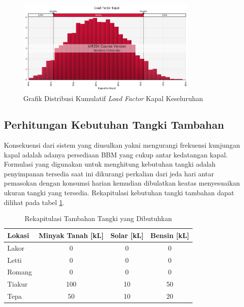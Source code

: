 \begin{figure}[htbp!]
    \centering
    \includegraphics[width=0.8\textwidth]{gambar/loadfactor-ship-overall.png}
    \caption{Grafik Distribusi Kumulatif \emph{Load Factor} Kapal Keseluruhan}
    \label{fig:load-factor-kapal-overall}
\end{figure}


\subsection{Perhitungan Kebutuhan Tangki Tambahan}
\label{subsec:hitungan-tangki}

Konsekuensi dari sistem yang diusulkan yakni mengurangi frekuensi kunjungan kapal adalah adanya persediaan BBM yang cukup antar kedatangan kapal. Formulasi yang digunakan untuk menghitung kebutuhan tangki adalah penyimpanan tersedia saat ini dikurangi perkalian dari jeda hari antar pemasokan dengan konsumsi harian kemudian dibulatkan keatas menyesuaikan ukuran tangki yang tersedia. Rekapitulasi kebutuhan tangki tambahan dapat dilihat pada tabel \ref{rekapitulasi-tambahan-tangki}.

\begin{table}[!htbp]
    \centering
    \caption{Rekapitulasi Tambahan Tangki yang Dibutuhkan}
    \begin{tabular}{|l|c|c|c|}
    \hline
        \textbf{Lokasi} & \textbf{Minyak Tanah [kL]} & \textbf{Solar [kL]} & \textbf{Bensin [kL]} \\ \hline
        Lakor & 0 & 0 & 0 \\ \hline
        Letti & 0 & 0 & 0 \\ \hline
        Romang & 0 & 0 & 0 \\ \hline
        Tiakur & 100 & 10 & 50 \\ \hline
        Tepa & 50 & 10 & 20 \\ \hline
    \end{tabular}
    \label{rekapitulasi-tambahan-tangki}
\end{table}
